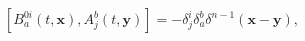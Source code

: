 \begin{equation}
\left[ B_{a}^{0i}(t,\mathbf{x}),A_{j}^{b}(t,\mathbf{y})\right] =-\delta
_{j}^{i}\delta _{a}^{b}\delta ^{n-1}\left( \mathbf{x-y}\right) ,  \label{f8}
\end{equation}

